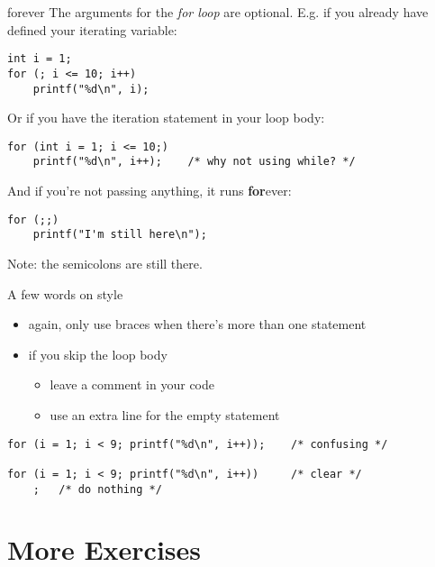 \begin{frame}[fragile]{forever}
	The arguments for the \textit{for loop} are optional. E.g. if you already have defined your iterating variable:
	\begin{lstlisting}[numbers=none]
int i = 1;
for (; i <= 10; i++)
	printf("%d\n", i);
\end{lstlisting}
	Or if you have the iteration statement in your loop body:
	\begin{lstlisting}[numbers=none]
for (int i = 1; i <= 10;)
	printf("%d\n", i++);	/* why not using while? */
\end{lstlisting}
	And if you're not passing anything, it runs \textbf{for}ever:
	\begin{lstlisting}[numbers=none]
for (;;)
	printf("I'm still here\n");
\end{lstlisting}
Note: the semicolons are still there.
\end{frame}
\begin{frame}[fragile]{A few words on style}
	\begin{itemize}
		\item again, only use braces when there's more than one statement
		\item if you skip the loop body
		\begin{itemize}
			\item leave a comment in your code
			\item use an extra line for the empty statement
		\end{itemize}
	\end{itemize}
		\begin{lstlisting}[numbers=none]
for (i = 1; i < 9; printf("%d\n", i++));	/* confusing */

for (i = 1; i < 9; printf("%d\n", i++))		/* clear */
	;	/* do nothing */
\end{lstlisting}
\end{frame}
\section{More Exercises}
